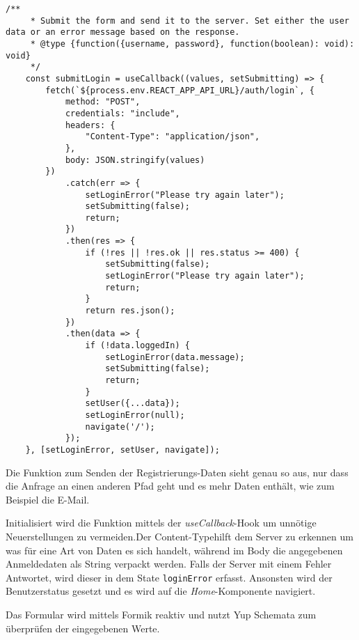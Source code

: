 \begin{lstlisting}[style=codeStyle, caption={Die Funktion zum Senden der Benutzerdaten an das Backend}, label={lst:submitLogin}]
    /**
     * Submit the form and send it to the server. Set either the user data or an error message based on the response.
     * @type {function({username, password}, function(boolean): void): void}
     */
    const submitLogin = useCallback((values, setSubmitting) => {
        fetch(`${process.env.REACT_APP_API_URL}/auth/login`, {
            method: "POST",
            credentials: "include",
            headers: {
                "Content-Type": "application/json",
            },
            body: JSON.stringify(values)
        })
            .catch(err => {
                setLoginError("Please try again later");
                setSubmitting(false);
                return;
            })
            .then(res => {
                if (!res || !res.ok || res.status >= 400) {
                    setSubmitting(false);
                    setLoginError("Please try again later");
                    return;
                }
                return res.json();
            })
            .then(data => {
                if (!data.loggedIn) {
                    setLoginError(data.message);
                    setSubmitting(false);
                    return;
                }
                setUser({...data});
                setLoginError(null);
                navigate('/');
            });
    }, [setLoginError, setUser, navigate]);
\end{lstlisting}

Die Funktion zum Senden der Registrierungs-Daten sieht genau so aus, nur dass die Anfrage an einen anderen Pfad geht und es mehr Daten enthält, wie zum Beispiel die E-Mail.

Initialisiert wird die Funktion mittels der \textit{useCallback}-Hook um unnötige Neuerstellungen zu vermeiden.Der \glqq Content-Type\grqq{ }hilft dem Server zu erkennen um was für eine Art von Daten es sich handelt, während im Body die angegebenen Anmeldedaten als String verpackt werden. Falls der Server mit einem Fehler Antwortet, wird dieser in dem State \verb|loginError| erfasst. Ansonsten wird der Benutzerstatus gesetzt und es wird auf die \textit{Home}-Komponente navigiert.

Das Formular wird mittels Formik reaktiv und nutzt Yup Schemata zum überprüfen der eingegebenen Werte.

